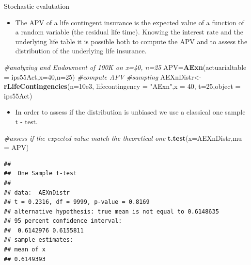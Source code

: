 \documentclass[ignorenonframetext,]{beamer}
\newenvironment{Shaded}{\begin{snugshade}}{\end{snugshade}}
\newcommand{\KeywordTok}[1]{\textcolor[rgb]{0.13,0.29,0.53}{\textbf{{#1}}}}
\newcommand{\DataTypeTok}[1]{\textcolor[rgb]{0.13,0.29,0.53}{{#1}}}
\newcommand{\DecValTok}[1]{\textcolor[rgb]{0.00,0.00,0.81}{{#1}}}
\newcommand{\FloatTok}[1]{\textcolor[rgb]{0.00,0.00,0.81}{{#1}}}
\newcommand{\StringTok}[1]{\textcolor[rgb]{0.31,0.60,0.02}{{#1}}}
\newcommand{\CommentTok}[1]{\textcolor[rgb]{0.56,0.35,0.01}{\textit{{#1}}}}
\newcommand{\NormalTok}[1]{{#1}}
\begin{document}
\begin{frame}[fragile]{Stochastic evalutation}

\begin{itemize}[<+->]
\itemsep1pt\parskip0pt
\item
  The APV of a life contingent insurance is the expected value of a
  function of a random variable (the residual life time). Knowing the
  interest rate and the underlying life table it is possible both to
  compute the APV and to assess the distribution of the underlying life
  insurance.
\end{itemize}

\begin{Shaded}
\begin{Highlighting}[]
\CommentTok{#analyzing and Endowment of 100K on x=40, n=25}
\NormalTok{APV=}\KeywordTok{AExn}\NormalTok{(}\DataTypeTok{actuarialtable =} \NormalTok{ips55Act,}\DataTypeTok{x=}\DecValTok{40}\NormalTok{,}\DataTypeTok{n=}\DecValTok{25}\NormalTok{) }\CommentTok{#compute APV}
\CommentTok{#sampling}
\NormalTok{AEXnDistr<-}\KeywordTok{rLifeContingencies}\NormalTok{(}\DataTypeTok{n=}\FloatTok{10e3}\NormalTok{,}
\DataTypeTok{lifecontingency =} \StringTok{"AExn"}\NormalTok{,}\DataTypeTok{x =} \DecValTok{40}\NormalTok{,}
\DataTypeTok{t=}\DecValTok{25}\NormalTok{,}\DataTypeTok{object =} \NormalTok{ips55Act)}
\end{Highlighting}
\end{Shaded}

\end{frame}

\begin{frame}[fragile]

\begin{itemize}[<+->]
\itemsep1pt\parskip0pt
\item
  In order to assess if the distribution is unbiased we use a classical
  one sample t - test.
\end{itemize}

\begin{Shaded}
\begin{Highlighting}[]
\CommentTok{#assess if the expected value match the theoretical one}
\KeywordTok{t.test}\NormalTok{(}\DataTypeTok{x=}\NormalTok{AEXnDistr,}\DataTypeTok{mu =} \NormalTok{APV)}
\end{Highlighting}
\end{Shaded}

\begin{verbatim}
## 
##  One Sample t-test
## 
## data:  AEXnDistr
## t = 0.2316, df = 9999, p-value = 0.8169
## alternative hypothesis: true mean is not equal to 0.6148635
## 95 percent confidence interval:
##  0.6142976 0.6155811
## sample estimates:
## mean of x 
## 0.6149393
\end{verbatim}

\end{frame}
\end{document}
